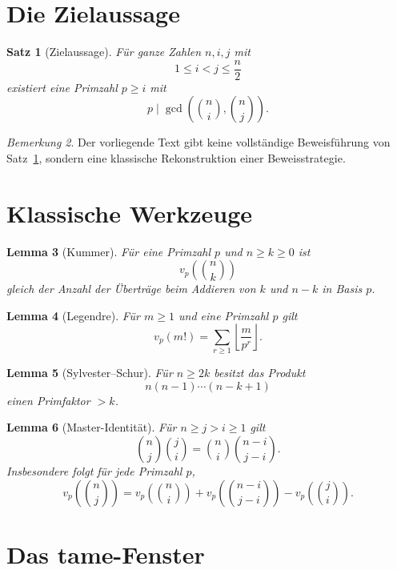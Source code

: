 \documentclass[12pt,a4paper]{article}
\theoremstyle{plain}
\newtheorem{theorem}{Satz}[section]
\newtheorem{lemma}[theorem]{Lemma}
\theoremstyle{definition}
\theoremstyle{remark}
\newtheorem{remark}[theorem]{Bemerkung}
\begin{document}
	\section{Die Zielaussage}
	
	\begin{theorem}[Zielaussage]
		\label{thm:target}
		Für ganze Zahlen \(n,i,j\) mit
		\[
		1\le i<j\le \frac n2
		\]
		existiert eine Primzahl \(p\ge i\) mit
		\[
		p\mid \gcd\!\left(\binom ni,\binom nj\right).
		\]
	\end{theorem}
	
	\begin{remark}
		Der vorliegende Text gibt keine vollständige Beweisführung von Satz~\ref{thm:target}, sondern eine klassische Rekonstruktion einer Beweisstrategie.
	\end{remark}
	
	\section{Klassische Werkzeuge}
	
	\begin{lemma}[Kummer]
		Für eine Primzahl \(p\) und \(n\ge k\ge0\) ist
		\[
		v_p\!\left(\binom nk\right)
		\]
		gleich der Anzahl der Überträge beim Addieren von \(k\) und \(n-k\) in Basis \(p\).
	\end{lemma}
	
	\begin{lemma}[Legendre]
		Für \(m\ge1\) und eine Primzahl \(p\) gilt
		\[
		v_p(m!)=\sum_{r\ge1}\left\lfloor \frac{m}{p^r}\right\rfloor.
		\]
	\end{lemma}
	
	\begin{lemma}[Sylvester--Schur]
		\label{lem:sylvester-schur}
		Für \(n\ge 2k\) besitzt das Produkt
		\[
		n(n-1)\cdots(n-k+1)
		\]
		einen Primfaktor \(>k\).
	\end{lemma}
	
	\begin{lemma}[Master-Identität]
		\label{lem:master}
		Für \(n\ge j>i\ge1\) gilt
		\[
		\binom nj \binom ji
		=
		\binom ni \binom{n-i}{j-i}.
		\]
		Insbesondere folgt für jede Primzahl \(p\),
		\[
		v_p\!\left(\binom nj\right)
		=
		v_p\!\left(\binom ni\right)
		+
		v_p\!\left(\binom{n-i}{j-i}\right)
		-
		v_p\!\left(\binom ji\right).
		\]
	\end{lemma}
	
	\section{Das tame-Fenster}
	
\end{document}
